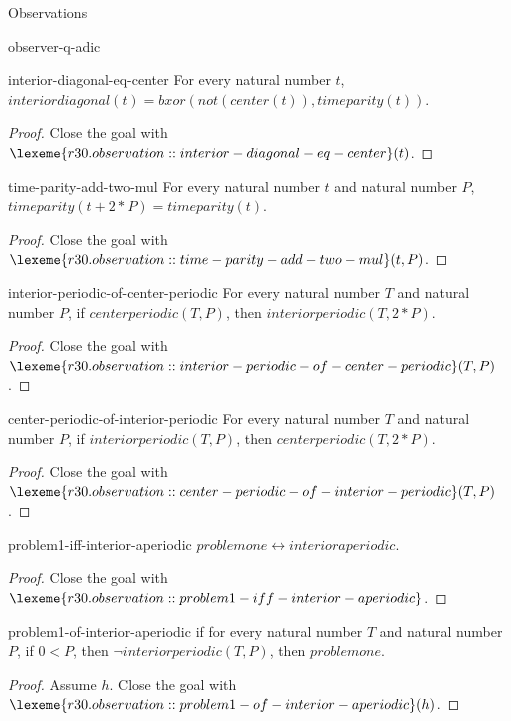 \begin{lexlean}{Observations}
\begin{section}{observer-q-adic}
\begin{theorem}{interior-diagonal-eq-center}
For every natural number \(t\), \(interiordiagonal(t) = bxor(not(center(t)), timeparity(t))\).
\begin{proof}
Close the goal with \(\lexeme{r30.observation::interior-diagonal-eq-center}(t)\).
\end{proof}
\end{theorem}

\begin{theorem}{time-parity-add-two-mul}
For every natural number \(t\) and natural number \(P\), \(timeparity(t + 2 * P) = timeparity(t)\).
\begin{proof}
Close the goal with \(\lexeme{r30.observation::time-parity-add-two-mul}(t, P)\).
\end{proof}
\end{theorem}

\begin{theorem}{interior-periodic-of-center-periodic}
For every natural number \(T\) and natural number \(P\), if \(centerperiodic(T, P)\), then \(interiorperiodic(T, 2 * P)\).
\begin{proof}
Close the goal with \(\lexeme{r30.observation::interior-periodic-of-center-periodic}(T, P)\).
\end{proof}
\end{theorem}

\begin{theorem}{center-periodic-of-interior-periodic}
For every natural number \(T\) and natural number \(P\), if \(interiorperiodic(T, P)\), then \(centerperiodic(T, 2 * P)\).
\begin{proof}
Close the goal with \(\lexeme{r30.observation::center-periodic-of-interior-periodic}(T, P)\).
\end{proof}
\end{theorem}

\begin{theorem}{problem1-iff-interior-aperiodic}
\(problemone ↔ interioraperiodic\).
\begin{proof}
Close the goal with \(\lexeme{r30.observation::problem1-iff-interior-aperiodic}\).
\end{proof}
\end{theorem}

\begin{theorem}{problem1-of-interior-aperiodic}
if for every natural number \(T\) and natural number \(P\), if \(0 < P\), then \(¬ interiorperiodic(T, P)\), then \(problemone\).
\begin{proof}
Assume \(h\).
Close the goal with \(\lexeme{r30.observation::problem1-of-interior-aperiodic}(h)\).
\end{proof}
\end{theorem}


\end{section}
\end{lexlean}
